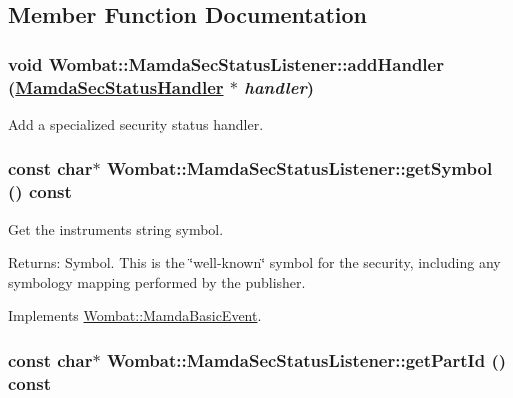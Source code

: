 \subsection{Member Function Documentation}
\hypertarget{classWombat_1_1MamdaSecStatusListener_fbf8cac77c1dbdc8da4173df05dc5b4c}{
\subsubsection[addHandler]{\setlength{\rightskip}{0pt plus 5cm}void Wombat::Mamda\-Sec\-Status\-Listener::add\-Handler (\hyperlink{classWombat_1_1MamdaSecStatusHandler}{Mamda\-Sec\-Status\-Handler} $\ast$ {\em handler})}}
\label{classWombat_1_1MamdaSecStatusListener_fbf8cac77c1dbdc8da4173df05dc5b4c}


Add a specialized security status handler. 

\hypertarget{classWombat_1_1MamdaSecStatusListener_763d9b2fb391bc22abfe9223dd17bb8e}{
\subsubsection[getSymbol]{\setlength{\rightskip}{0pt plus 5cm}const char$\ast$ Wombat::Mamda\-Sec\-Status\-Listener::get\-Symbol () const}}
\label{classWombat_1_1MamdaSecStatusListener_763d9b2fb391bc22abfe9223dd17bb8e}


Get the instruments string symbol. 

\begin{Desc}
\item[Returns:]Symbol. This is the \char`\"{}well-known\char`\"{} symbol for the security, including any symbology mapping performed by the publisher. \end{Desc}


Implements \hyperlink{classWombat_1_1MamdaBasicEvent_8783b136a1305d21c578ced8618c090b}{Wombat::Mamda\-Basic\-Event}.\hypertarget{classWombat_1_1MamdaSecStatusListener_26936960eb39c5972eff2a4da4036fd3}{
\subsubsection[getPartId]{\setlength{\rightskip}{0pt plus 5cm}const char$\ast$ Wombat::Mamda\-Sec\-Status\-Listener::get\-Part\-Id () const}}
\label{classWombat_1_1MamdaSecStatusListener_26936960eb39c5972eff2a4da4036fd3}


